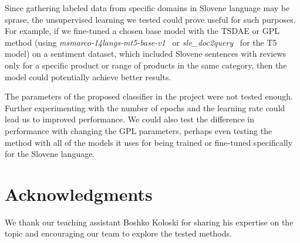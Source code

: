 \documentclass[fleqn,moreauthors,10pt]{ds_report}
\begin{document}
Since gathering labeled data from specific domains in Slovene language may be sprase, the unsupervised learning we tested could prove useful for such purposes. For example, if we fine-tuned a chosen base model with the TSDAE or GPL method (using {\it msmarco-14langs-mt5-base-v1}~\cite{msmarco14langs} or {\it slv\_doc2query}~\cite{boshko} for the T5 model) on a sentiment dataset, which included Slovene sentences with reviews only for a specific product or range of products in the same category, then the model could potentially achieve better results.

The parameters of the proposed classifier in the project were not tested enough. Further experimenting with the number of epochs and the learning rate could lead us to improved performance. We could also test the difference in performance with changing the GPL parameters, perhaps even testing the method with all of the models it uses for being trained or fine-tuned specifically for the Slovene language.





\section*{Acknowledgments}

We thank our teaching assistant Boshko Koloski for sharing his expertise on the topic and encouraging our team to explore the tested methods.




\end{document}
